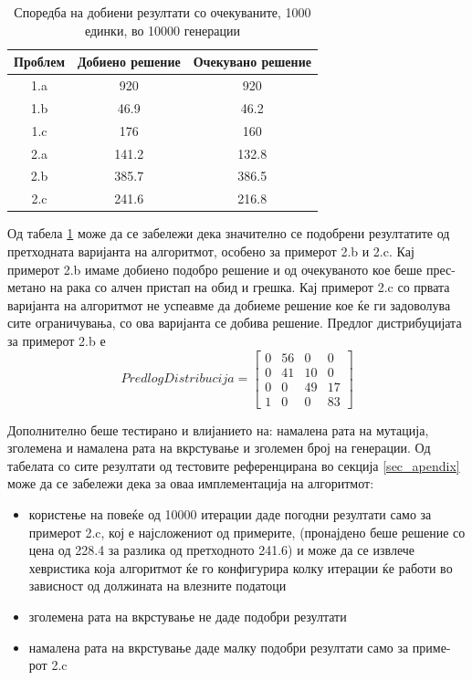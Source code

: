 \documentclass{article}
\begin{document}
\begin{table}[h!]
\centering
\begin{tabular}{||c c c||} 
 \hline
 Проблем & Добиено решение & Очекувано решение \\ [0.5ex]
 \hline\hline
 1.a & 920 & 920\\ 
 1.b & 46.9 & 46.2 \\
 1.c & 176 & 160 \\
 2.a & 141.2 & 132.8 \\
 2.b & 385.7 & 386.5 \\
 2.c & 241.6 & 216.8 \\ [1ex] 
 \hline
\end{tabular}
\caption{Споредба на добиени резултати со очекуваните, 1000 единки, во 10000 генерации}
\label{table_rez_ver2}
\end{table}

Од табела \ref{table_rez_ver2} може да се забележи дека значително се подобрени резултатите од претходната варијанта на алгоритмот, особено за примерот 2.b и 2.c. Кај примерот 2.b имаме добиено подобро решение и од очекуваното кое беше прес-метано на рака со алчен пристап на обид и грешка. Кај примерот 2.c со првата варијанта на алгоритмот не успеавме да добиеме решение кое ќе ги задоволува сите ограничувања, со ова варијанта се добива решение. Предлог дистрибуцијата за примерот 2.b е 
\[PredlogDistribucija = \begin{bmatrix} 0 & 56 & 0 & 0 \\ 0 & 41 & 10 & 0 \\ 0 & 0 & 49 & 17 \\ 1 & 0 & 0 & 83 \end{bmatrix}\]

Дополнително беше тестирано и влијанието на: намалена рата на мутација, зголемена и намалена рата на вкрстување и зголемен број на генерации. Од табелата со сите резултати од тестовите референцирана во секција \ref{sec_apendix} може да се забележи дека за оваа имплементација на алгоритмот:
\begin{itemize}
\item користење на повеќе од 10000 итерации даде погодни резултати само за примерот 2.c, кој е најсложениот од примерите, (пронајдено беше решение со цена од 228.4 за разлика од претходното 241.6) и може да се извлече хевристика која алгоритмот ќе го конфигурира колку итерации ќе работи во зависност од должината на влезните податоци
\item зголемена рата на вкрстување не даде подобри резултати
\item намалена рата на вкрстување даде малку подобри резултати само за приме-рот 2.c 
\end{itemize}
\end{document}
